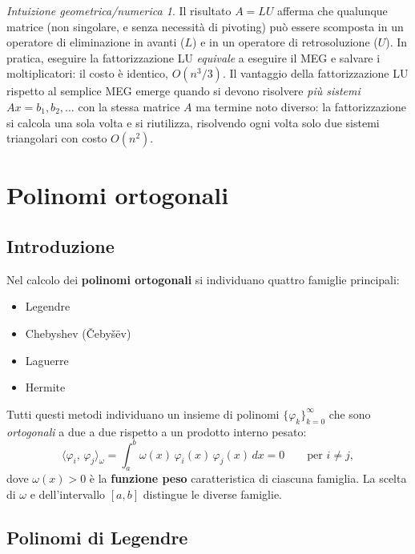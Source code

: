 \documentclass[a4paper,12pt]{article}
\theoremstyle{definition}
\theoremstyle{remark}
\newtheorem*{intuizione}{Intuizione geometrica/numerica}
\begin{document}
\begin{intuizione}
Il risultato $A = LU$ afferma che qualunque matrice (non singolare, e senza necessità di pivoting)
può essere scomposta in un operatore di eliminazione in avanti ($L$) e in un operatore di
retrosoluzione ($U$). In pratica, eseguire la fattorizzazione LU \emph{equivale} a eseguire il MEG
e salvare i moltiplicatori: il costo è identico, $O(n^3/3)$. Il vantaggio della fattorizzazione LU
rispetto al semplice MEG emerge quando si devono risolvere \emph{più sistemi} $Ax = b_1, b_2,
\ldots$ con la stessa matrice $A$ ma termine noto diverso: la fattorizzazione si calcola una sola
volta e si riutilizza, risolvendo ogni volta solo due sistemi triangolari con costo $O(n^2)$.
\end{intuizione}


\section{Polinomi ortogonali}

\subsection{Introduzione}

Nel calcolo dei \textbf{polinomi ortogonali} si individuano quattro famiglie principali:
\begin{itemize}
  \item Legendre
  \item Chebyshev (Čebyšëv)
  \item Laguerre
  \item Hermite
\end{itemize}
Tutti questi metodi individuano un insieme di polinomi $\{\varphi_k\}_{k=0}^{\infty}$
che sono \emph{ortogonali} a due a due rispetto a un prodotto interno pesato:
\[
  \langle \varphi_i,\, \varphi_j \rangle_\omega
    = \int_a^b \omega(x)\,\varphi_i(x)\,\varphi_j(x)\,dx = 0
    \qquad \text{per } i \neq j,
\]
dove $\omega(x) > 0$ è la \textbf{funzione peso} caratteristica di ciascuna famiglia.
La scelta di $\omega$ e dell'intervallo $[a,b]$ distingue le diverse famiglie.

\subsection{Polinomi di Legendre}
\end{document}
